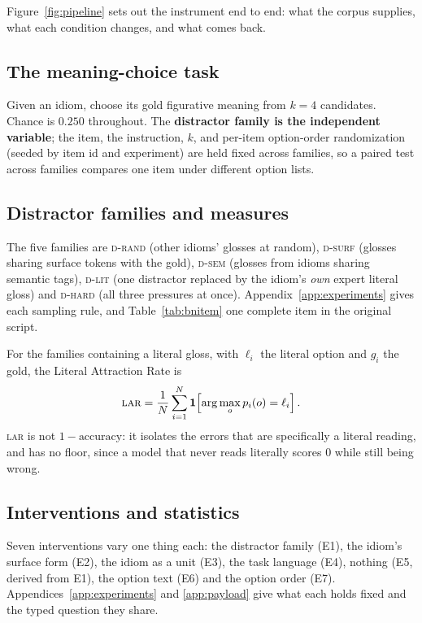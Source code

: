 \documentclass[11pt]{article}
\newcommand{\Drand}{\textsc{d-rand}}
\newcommand{\Dsurf}{\textsc{d-surf}}
\newcommand{\Dsem}{\textsc{d-sem}}
\newcommand{\Dlit}{\textsc{d-lit}}
\newcommand{\Dhard}{\textsc{d-hard}}
\newcommand{\LAR}{\textsc{lar}}
\begin{document}
Figure~\ref{fig:pipeline} sets out the instrument end to end: what the corpus
supplies, what each condition changes, and what comes back.

\subsection{The meaning-choice task}

Given an idiom, choose its gold figurative meaning from $k=4$
candidates. Chance is $0.250$ throughout. The \textbf{distractor family is the
independent variable}; the item, the instruction, $k$, and per-item option-order
randomization (seeded by item id and experiment) are held fixed across families,
so a paired test across families compares one item under different option lists.

\subsection{Distractor families and measures}

The five families are \Drand{} (other idioms' glosses at random), \Dsurf{}
(glosses sharing surface tokens with the gold), \Dsem{} (glosses from idioms
sharing semantic tags), \Dlit{} (one distractor replaced by the idiom's
\emph{own} expert literal gloss) and \Dhard{} (all three pressures at once).
Appendix~\ref{app:experiments} gives each sampling rule, and
Table~\ref{tab:bnitem} one complete item in the original script.

For the families containing a literal gloss, with $\ell_i$ the literal option
and $g_i$ the gold, the Literal Attraction Rate is
\[
\LAR = \frac{1}{N}\sum_{i=1}^{N} \mathbf{1}\!\left[\arg\max_o p_i(o) = \ell_i\right].
\]
\LAR{} is not $1-\text{accuracy}$: it isolates the errors that are specifically
a literal reading, and has no floor, since a model that never reads literally
scores $0$ while still being wrong.

\subsection{Interventions and statistics}

Seven interventions vary one thing each: the distractor family (E1), the
idiom's surface form (E2), the idiom as a unit (E3), the task language (E4),
nothing (E5, derived from E1), the option text (E6) and the option order (E7).
Appendices~\ref{app:experiments} and \ref{app:payload} give what each holds
fixed and the typed question they share.
\end{document}
